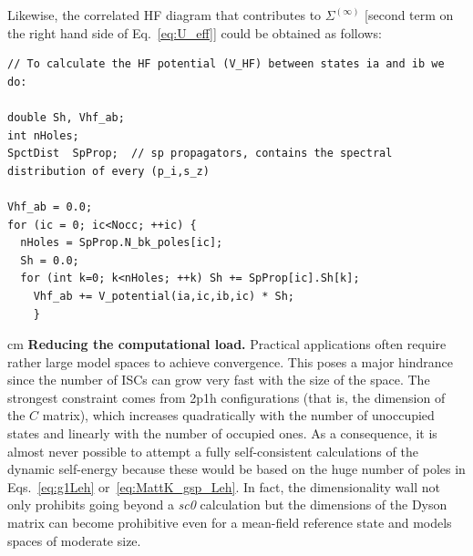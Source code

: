 Likewise, the correlated HF diagram that contributes to $\Sigma^{(\infty)}$ [second term on the right hand side of Eq.~\eqref{eq:U_eff}] could be obtained
as follows:
\lstset{language=c++}
\begin{lstlisting}
// To calculate the HF potential (V_HF) between states ia and ib we do:

double Sh, Vhf_ab;
int nHoles;
SpctDist  SpProp;  // sp propagators, contains the spectral distribution of every (p_i,s_z)

Vhf_ab = 0.0;
for (ic = 0; ic<Nocc; ++ic) {
  nHoles = SpProp.N_bk_poles[ic];
  Sh = 0.0;
  for (int k=0; k<nHoles; ++k) Sh += SpProp[ic].Sh[k];
    Vhf_ab += V_potential(ia,ic,ib,ic) * Sh;
    }
\end{lstlisting}


 cm
{\bf Reducing the computational load.}
  Practical applications often require rather large model spaces to achieve convergence.  This poses a major hindrance 
since the number of ISCs can grow very fast with the size of the space. The strongest constraint comes from
2p1h configurations (that is, the dimension of the $C$ matrix), which increases quadratically with the 
number of unoccupied states and linearly with the number of occupied ones. As a consequence, it is almost never possible
to attempt a fully self-consistent calculations of the dynamic self-energy because these would be based on the huge number of poles in 
Eqs.~\eqref{eq:g1Leh} or~\eqref{eq:MattK_gsp_Leh}. 
In fact, the dimensionality wall not only  prohibits going beyond a {\em sc0} calculation but the dimensions of the Dyson matrix
can become prohibitive even for a mean-field reference state and  models spaces of moderate size.

